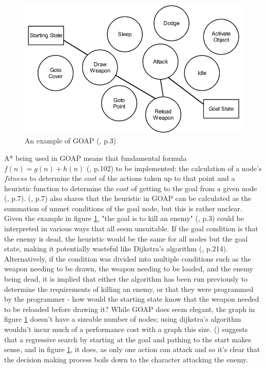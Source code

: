 \documentclass[11pt, a4paper]{article}
\begin{document}
\begin{figure}[h]
  \includegraphics[width=\linewidth]{img/goap_figure_1.png}
  \caption{An example of GOAP (\cite{orkin2003applying}, p.3)}
  \label{fig:goap}
\end{figure}

A* being used in GOAP means that fundamental formula $f(n) = g(n) + h(n)$ (\cite{hart1968formal}, p.102) to be implemented: the calculation of a node's $fitness$ to determine the $cost$ of the actions taken up to that point and a heuristic function to determine the $cost$ of getting to the goal from a given node (\cite{orkin2003applying}, p.7). \citeauthor{orkin2003applying} (\citeyear{orkin2003applying}, p.7) also shares that the heuristic in GOAP can be calculated as the summation of unmet conditions of the goal node, but this is rather unclear. Given the example in figure \ref{fig:goap}, "the goal is to kill an enemy" (\cite{orkin2003applying}, p.3) could be interpreted in various ways that all seem unsuitable. If the goal condition is that the enemy is dead, the heuristic would be the same for all nodes but the goal state, making it potentially wasteful like Dijkstra's algorithm (\cite{millington2019ai}, p.214). Alternatively, if the condition was divided into multiple conditions such as the weapon needing to be drawn, the weapon needing to be loaded, and the enemy being dead, it is implied that either the algorithm has been run previously to determine the requirements of killing an enemy, or that they were programmed by the programmer - how would the starting state know that the weapon needed to be reloaded before drawing it? While GOAP does seem elegant, the graph in figure \ref{fig:goap} doesn't have a sizeable number of nodes; using dijkstra's algorithm wouldn't incur much of a performance cost with a graph this size. \citeauthor{orkin2003applying} (\citeyear{orkin2003applying}) suggests that a regressive search by starting at the goal and pathing to the start makes sense, and in figure \ref{fig:goap}, it does, as only one action can attack and so it's clear that the decision making process boils down to the character attacking the enemy.
\end{document}
